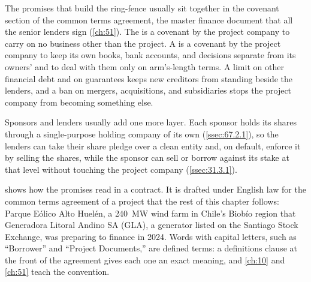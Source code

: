 The promises that build the ring-fence usually sit together in the covenant section of the common terms agreement, the master finance document that all the senior lenders sign (\cref{ch:51}). The  is a covenant by the project company to carry on no business other than the project. A  is a covenant by the project company to keep its own books, bank accounts, and decisions separate from its owners' and to deal with them only on arm's-length terms. A limit on other financial debt and on guarantees keeps new creditors from standing beside the lenders, and a ban on mergers, acquisitions, and subsidiaries stops the project company from becoming something else.

Sponsors and lenders usually add one more layer. Each sponsor holds its shares through a single-purpose holding company of its own (\cref{ssec:67.2.1}), so the lenders can take their share pledge over a clean entity and, on default, enforce it by selling the shares, while the sponsor can sell or borrow against its stake at that level without touching the project company (\cref{ssec:31.3.1}).

 shows how the promises read in a contract. It is drafted under English law for the common terms agreement of a project that the rest of this chapter follows: Parque Eólico Alto Huelén, a 240~MW wind farm in Chile's Biobío region that Generadora Litoral Andino SA (GLA), a generator listed on the Santiago Stock Exchange, was preparing to finance in 2024. Words with capital letters, such as ``Borrower'' and ``Project Documents,'' are defined terms: a definitions clause at the front of the agreement gives each one an exact meaning, and \cref{ch:10} and \cref{ch:51} teach the convention.

